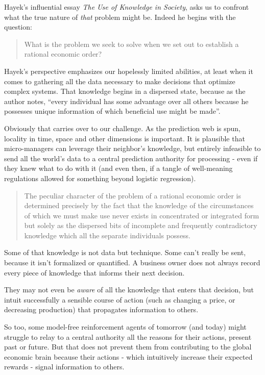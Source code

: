 Hayek's influential essay {\em The Use of Knowledge in Society}, asks us to confront what the true nature of {\em that} problem might be. Indeed he begins with the question:

\begin{quote}{\cite{Hayek1945TheHayek}}
     What is the problem we seek to solve when we set out to establish a rational economic order? 
\end{quote}

Hayek's perspective emphasizes our hopelessly limited abilities, at least when it comes to gathering all the data necessary to make decisions that optimize complex systems. That knowledge begins in a dispersed state, because as the author notes, ``every individual has some advantage over all others because he possesses unique information of which beneficial use might be made''. 

Obviously that carries over to our challenge. As the prediction web is spun, locality in time, space and other dimensions is important. It is plausible that micro-managers can leverage their neighbor's knowledge, but entirely infeasible to send all the world's data to a central prediction authority for processing - even if they knew what to do with it (and even then, if a tangle of well-meaning regulations allowed for something beyond logistic regression).  

\begin{quote}{\cite{Hayek1945TheHayek}}
The peculiar character of the problem of a rational economic order is determined precisely by the fact that the knowledge of the circumstances of which we must make use never exists in concentrated or integrated form but solely as the dispersed bits of incomplete and frequently contradictory knowledge which all the separate individuals possess.
\end{quote}

Some of that knowledge is not data but technique. Some can't really be sent, because it isn't formalized or quantified. A business owner does not always record every piece of knowledge that informs their next decision. 

They may not even be {\em aware} of all the knowledge that enters that decision, but intuit successfully a sensible course of action (such as changing a price, or decreasing production) that propagates information to others. 

So too, some model-free reinforcement agents of tomorrow (and today) might struggle to relay to a central authority all the reasons for their actions, present past or future. But that does not prevent them from contributing to the global economic brain because their actions - which intuitively increase their expected rewards - signal information to others. 


